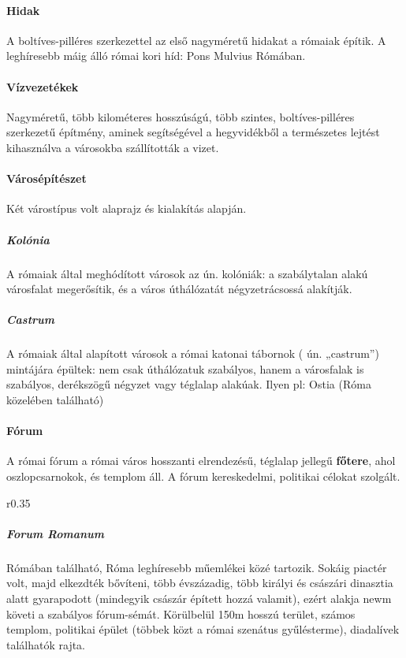 \paragraph{Hidak}
A boltíves-pilléres szerkezettel az első nagyméretű hidakat a rómaiak építik. A leghíresebb máig álló római kori híd: Pons Mulvius Rómában.

\paragraph{Vízvezetékek}
Nagyméretű, több kilométeres hosszúságú, több szintes, boltíves-pilléres szerkezetű építmény, aminek segítségével a hegyvidékből a természetes lejtést kihasználva a városokba szállították a vizet.

\paragraph{Városépítészet}
Két várostípus volt alaprajz és kialakítás alapján.

	\subparagraph{Kolónia}
	A rómaiak által meghódított városok az ún. kolóniák: a szabálytalan alakú városfalat megerősítik, és a város úthálózatát négyzetrácsossá alakítják.
	
	\subparagraph{Castrum}
	A rómaiak által alapított városok a római katonai tábornok ( ún. „castrum”) mintájára épültek: nem csak úthálózatuk szabályos, hanem a városfalak is szabályos, derékszögű négyzet vagy téglalap alakúak. Ilyen pl: Ostia (Róma közelében található)

\paragraph{Fórum}
A római fórum a római város hosszanti elrendezésű, téglalap jellegű \textbf{főtere}, ahol oszlopcsarnokok, és templom áll. A fórum kereskedelmi, politikai célokat szolgált.

	\begin{wrapfigure}{r}{0.35\textwidth}
	\end{wrapfigure}

	\subparagraph{Forum Romanum} Rómában található, Róma leghíresebb műemlékei közé tartozik. Sokáig piactér volt, majd elkezdték bővíteni, több évszázadig, több királyi és császári dinasztia alatt gyarapodott (mindegyik császár épített hozzá valamit), ezért alakja newm követi a szabályos fórum-sémát. Körülbelül 150m hosszú terület, számos templom, politikai épület (többek közt a római szenátus gyűlésterme), diadalívek találhatók rajta.

